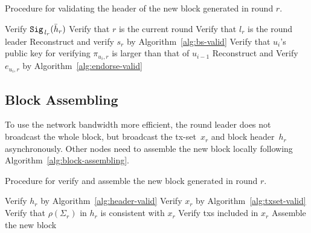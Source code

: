 \documentclass{article}
\begin{document}
\begin{algorithm}[H]
\caption{Procedure for validating the header of the new block generated in round $r$.}
\label{alg:header-valid}
\begin{spacing}{1.2}
\begin{algorithmic}[1]
    \vspace{1ex}
    \State Verify ${\tt Sig}_{\,l_r}(\bar{h}_r)$
    \State Verify that $r$ is the current round
    \State Verify that $l_r$ is the round leader
    \State Reconstruct and verify $s_r$ by Algorithm~\ref{alg:bs-valid}
            \State Verify that $u_i$'s public key for verifying $\pi_{u_i,r}$ is larger than that of $u_{i-1}$
        \EndIf
        \State Reconstruct and Verify $e_{u_i,r}$ by Algorithm~\ref{alg:endorse-valid}
    \EndFor
\end{algorithmic}
\end{spacing}
\end{algorithm}

\subsection{Block Assembling}
To use the network bandwidth more efficient, the round leader does not broadcast the whole block, but broadcast the tx-set~$x_r$ and block header~$h_r$ asynchronously. Other nodes need to assemble the new block locally following Algorithm~\ref{alg:block-assembling}.

\begin{algorithm}[H]
\caption{Procedure for verify and assemble the new block generated in round $r$.}
\label{alg:block-assembling}
\begin{spacing}{1.2}
\begin{algorithmic}[1]
    \vspace{1ex}
    \State Verify $h_r$ by Algorithm~\ref{alg:header-valid}
    \State Verify $x_r$ by Algorithm~\ref{alg:txset-valid}
    \State Verify that $\rho(\Sigma_r)$ in $h_r$ is consistent with $x_r$
    \State Verify txs included in $x_r$
    \State Assemble the new block
\end{algorithmic}
\end{spacing}
\end{algorithm}
\end{document}
